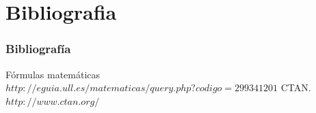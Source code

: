 \documentclass{beamer}
\begin{document}
\section{Bibliografia}
\begin{frame}
  \frametitle{Bibliografía}
  \begin{thebibliography}{10}
    \beamertemplatebookbibitems
   Fórmulas matemáticas
    {\small $http://eguia.ull.es/matematicas/query.php?codigo=299341201$}
    \beamertemplatebookbibitems
    CTAN. {\small $http://www.ctan.org/$}
  \end{thebibliography}
\end{frame}
\end{document}
